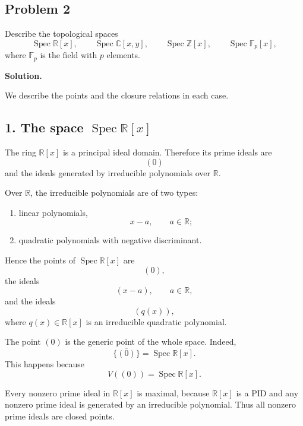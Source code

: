 
\subsection*{Problem 2}
	
	Describe the topological spaces
	\[
	\operatorname{Spec} \mathbb R[x],
	\qquad
	\operatorname{Spec} \mathbb C[x,y],
	\qquad
	\operatorname{Spec} \mathbb Z[x],
	\qquad
	\operatorname{Spec} \mathbb F_p[x],
	\]
	where \(\mathbb F_p\) is the field with \(p\) elements.
	
	\bigskip
	
	\textbf{Solution.}
	
	We describe the points and the closure relations in each case.
	
	\subsection*{1. The space \(\operatorname{Spec} \mathbb R[x]\)}
	
	The ring \(\mathbb R[x]\) is a principal ideal domain. Therefore its prime ideals
	are
	\[
	(0)
	\]
	and the ideals generated by irreducible polynomials over \(\mathbb R\).
	
	Over \(\mathbb R\), the irreducible polynomials are of two types:
	
	\begin{enumerate}[label=\arabic*)]
		\item linear polynomials,
		\[
		x-a,
		\qquad a\in \mathbb R;
		\]
		
		\item quadratic polynomials with negative discriminant.
	\end{enumerate}
	
	Hence the points of \(\operatorname{Spec}\mathbb R[x]\) are
	\[
	(0),
	\]
	the ideals
	\[
	(x-a),
	\qquad a\in \mathbb R,
	\]
	and the ideals
	\[
	(q(x)),
	\]
	where \(q(x)\in\mathbb R[x]\) is an irreducible quadratic polynomial.
	
	The point \((0)\) is the generic point of the whole space. Indeed,
	\[
	\overline{\{(0)\}}=\operatorname{Spec}\mathbb R[x].
	\]
	This happens because
	\[
	V((0))=\operatorname{Spec}\mathbb R[x].
	\]
	
	Every nonzero prime ideal in \(\mathbb R[x]\) is maximal, because \(\mathbb R[x]\)
	is a PID and any nonzero prime ideal is generated by an irreducible polynomial.
	Thus all nonzero prime ideals are closed points.
	

